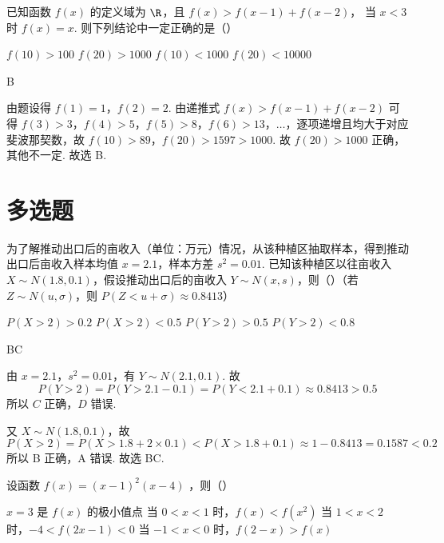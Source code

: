 \begin{problem}
已知函数 \(f(x)\) 的定义域为 \(\R\)，且
\(f(x)>f(x-1)+f(x-2)\)，
当 \(x<3\) 时 \(f(x)=x\). 则下列结论中一定正确的是（\quad）

\choices
    {\(f(10)>100\)}
    {\(f(20)>1000\)}
    {\(f(10)<1000\)}
    {\(f(20)<10000\)}
\end{problem}

\begin{answer}
B
\end{answer}

\begin{solution}
由题设得 \(f(1)=1\)，\(f(2)=2\). 由递推式 \(f(x)>f(x-1)+f(x-2)\) 可得 \(f(3)>3\)，\(f(4)>5\)，\(f(5)>8\)，\(f(6)>13\)，\(\dots\)，逐项递增且均大于对应斐波那契数，故
\(f(10)>89\)，\(f(20)>1597>1000\).
故 \(f(20)>1000\) 正确，其他不一定. 故选 B.
\end{solution}
\section{多选题}

\begin{problem}
为了解推动出口后的亩收入（单位：万元）情况，从该种植区抽取样本，得到推动出口后亩收入样本均值 \(x=2.1\)，样本方差 \(s^2=0.01\). 已知该种植区以往亩收入 \(X\sim N(1.8,0.1)\)，假设推动出口后的亩收入 \(Y\sim N(x,s)\)，则（\quad）（若 \(Z\sim N(u,\sigma)\)，则 \(P(Z<u+\sigma)\approx0.8413\)）

\choices
    {\(P(X>2)>0.2\)}
    {\(P(X>2)<0.5\)}
    {\(P(Y>2)>0.5\)}
    {\(P(Y>2)<0.8\)}
\end{problem}

\begin{answer}
BC
\end{answer}

\begin{solution}
由 \(x=2.1\)，\(s^2=0.01\)，有 \(Y\sim N(2.1,0.1)\). 故
\[
P(Y>2)=P(Y>2.1-0.1)=P(Y<2.1+0.1)\approx0.8413>0.5
\]
所以 \(C\) 正确，\(D\) 错误.

又 \(X\sim N(1.8,0.1)\)，故
\[
P(X>2)=P\left(X>1.8+2\times0.1\right)<P\left(X>1.8+0.1\right)\approx1-0.8413=0.1587<0.2
\]
所以 B 正确，A 错误. 故选 BC.
\end{solution}

\begin{problem}
设函数
\(f(x)=(x-1)^2(x-4)\)
，则（\quad）

\choices
    {\(x=3\) 是 \(f(x)\) 的极小值点}
    {当 \(0<x<1\) 时，\(f(x)<f(x^2)\)}
    {当 \(1<x<2\) 时，\(-4<f(2x-1)<0\)}
    {当 \(-1<x<0\) 时，\(f(2-x)>f(x)\)}
\end{problem}

